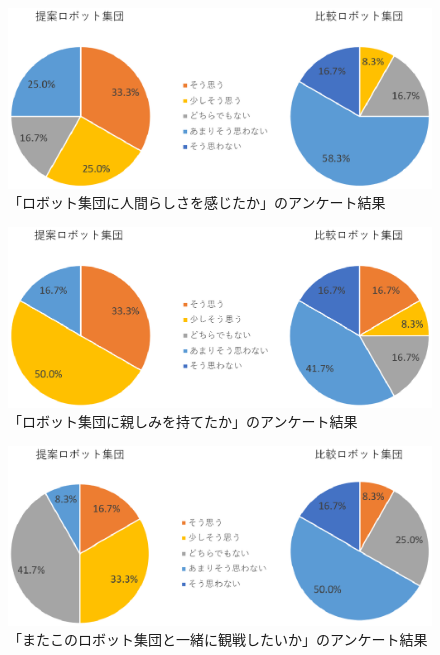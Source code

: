 \begin{figure}[!h]
 \begin{center}
\vspace{3cm}
  \centering
  \includegraphics[width=15cm]{images/chapter4/Q6.eps}
  \caption{「ロボット集団に人間らしさを感じたか」のアンケート結果}
  \label{Q6}
 \end{center}
\end{figure}

\newpage



\begin{figure}[!h]
 \begin{center}
\vspace{3cm}
  \centering
  \includegraphics[width=15cm]{images/chapter4/Q7.eps}
  \caption{「ロボット集団に親しみを持てたか」のアンケート結果}
  \label{Q7}
 \end{center}
\end{figure}




\begin{figure}[!h]
 \begin{center}
\vspace{2cm}
  \centering
  \includegraphics[width=15cm]{images/chapter4/Q8.eps}
  \caption{「またこのロボット集団と一緒に観戦したいか」のアンケート結果}
  \label{Q8}
 \end{center}
\end{figure}



